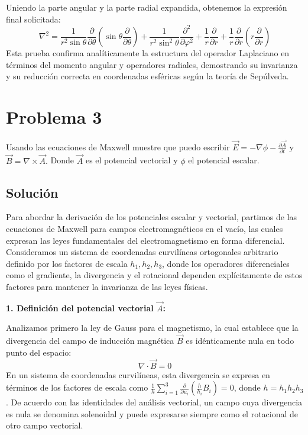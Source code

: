 \documentclass[a4paper]{article}
\begin{document}
Uniendo la parte angular y la parte radial expandida, obtenemos la expresión final solicitada:
\begin{equation}
\nabla^2 = \frac{1}{r^2 \sin \theta} \frac{\partial}{\partial \theta} \left( \sin \theta \frac{\partial}{\partial \theta} \right) + \frac{1}{r^2 \sin^2 \theta} \frac{\partial^2}{\partial \varphi^2} + \frac{1}{r} \frac{\partial}{\partial r} + \frac{1}{r} \frac{\partial}{\partial r} \left( r \frac{\partial}{\partial r} \right)
\end{equation}
Esta prueba confirma analíticamente la estructura del operador Laplaciano en términos del momento angular y operadores radiales, demostrando su invarianza y su reducción correcta en coordenadas esféricas según la teoría de Sepúlveda.


\section{Problema 3}
Usando las ecuaciones de Maxwell muestre que puedo escribir $\vec{E} = -\nabla\phi - \frac{\partial \vec{A}}{\partial t}$ y $\vec{B} = \nabla\times\vec{A}.$ Donde $\vec{A}$ es el potencial vectorial y $\phi$ el potencial escalar.

\subsection{Solución}

Para abordar la derivación de los potenciales escalar y vectorial, partimos de las ecuaciones de Maxwell para campos electromagnéticos en el vacío, las cuales expresan las leyes fundamentales del electromagnetismo en forma diferencial. Consideramos un sistema de coordenadas curvilíneas ortogonales arbitrario definido por los factores de escala $h_1, h_2, h_3$, donde los operadores diferenciales como el gradiente, la divergencia y el rotacional dependen explícitamente de estos factores para mantener la invarianza de las leyes físicas.

\textbf{1. Definición del potencial vectorial $\vec{A}$:}

Analizamos primero la ley de Gauss para el magnetismo, la cual establece que la divergencia del campo de inducción magnética $\vec{B}$ es idénticamente nula en todo punto del espacio:
\begin{equation}
\nabla \cdot \vec{B} = 0
\end{equation}
En un sistema de coordenadas curvilíneas, esta divergencia se expresa en términos de los factores de escala como $\frac{1}{h} \sum_{i=1}^3 \frac{\partial}{\partial u_i} \left( \frac{h}{h_i} B_i \right) = 0$, donde $h = h_1 h_2 h_3$. De acuerdo con las identidades del análisis vectorial, un campo cuya divergencia es nula se denomina solenoidal y puede expresarse siempre como el rotacional de otro campo vectorial. 
\end{document}
